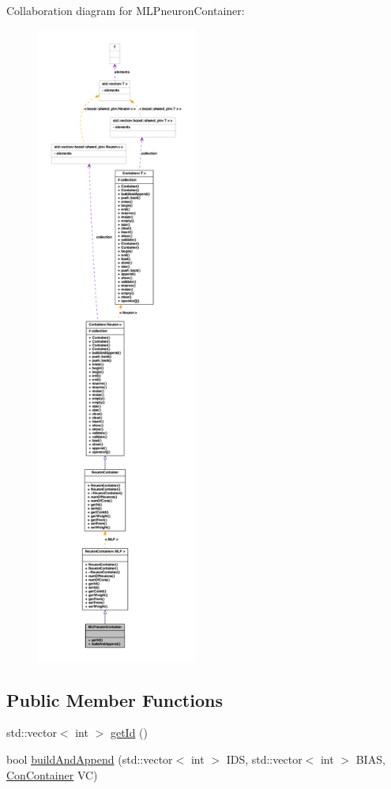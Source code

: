 Collaboration diagram for MLPneuronContainer:
\nopagebreak
\begin{figure}[H]
\begin{center}
\leavevmode
\includegraphics[height=600pt]{class_m_l_pneuron_container__coll__graph}
\end{center}
\end{figure}
\subsection*{Public Member Functions}
\begin{DoxyCompactItemize}
\item 
std::vector$<$ int $>$ \hyperlink{class_m_l_pneuron_container_a91f7def6fa9ee973b95f673642b2c586}{getId} ()
\item 
bool \hyperlink{class_m_l_pneuron_container_a98391f4cc53bb177c7abd0ff023f3cb0}{buildAndAppend} (std::vector$<$ int $>$ IDS, std::vector$<$ int $>$ BIAS, \hyperlink{class_con_container}{ConContainer} VC)
\end{DoxyCompactItemize}


